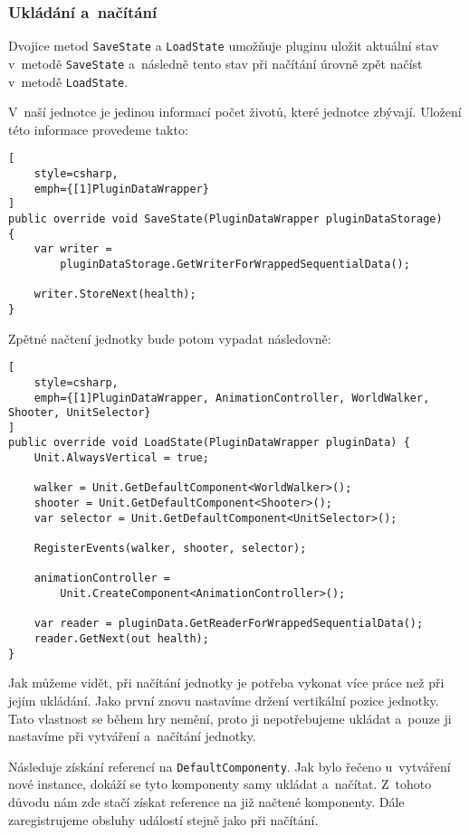 \subsubsection{Ukládání a~načítání}

Dvojice metod \texttt{SaveState} a \texttt{LoadState} umožňuje pluginu uložit aktuální stav v~metodě \texttt{SaveState} a~následně tento stav při načítání úrovně zpět načíst v~metodě \texttt{LoadState}.

V~naší jednotce je jedinou informací počet životů, které jednotce zbývají. Uložení této informace provedeme takto:
\begin{lstlisting}[
	style=csharp,
	emph={[1]PluginDataWrapper}
]
public override void SaveState(PluginDataWrapper pluginDataStorage)
{
	var writer = 
		pluginDataStorage.GetWriterForWrappedSequentialData();

	writer.StoreNext(health);
}
\end{lstlisting}

\newpage
Zpětné načtení jednotky bude potom vypadat následovně:
\begin{lstlisting}[
	style=csharp,
	emph={[1]PluginDataWrapper, AnimationController, WorldWalker, Shooter, UnitSelector}
]
public override void LoadState(PluginDataWrapper pluginData) {
	Unit.AlwaysVertical = true;

	walker = Unit.GetDefaultComponent<WorldWalker>();
	shooter = Unit.GetDefaultComponent<Shooter>();
	var selector = Unit.GetDefaultComponent<UnitSelector>();

	RegisterEvents(walker, shooter, selector);

	animationController =
		Unit.CreateComponent<AnimationController>();

	var reader = pluginData.GetReaderForWrappedSequentialData();
	reader.GetNext(out health);
}
\end{lstlisting}

Jak můžeme vidět, při načítání jednotky je potřeba vykonat více práce než při jejím ukládání. Jako první znovu nastavíme držení vertikální pozice jednotky. Tato vlastnost se během hry nemění, proto ji nepotřebujeme ukládat a~pouze ji nastavíme při vytváření a~načítání jednotky. 

Následuje získání referencí na \texttt{DefaultComponenty}. Jak bylo řečeno u~vytváření nové instance, dokáží se tyto komponenty samy ukládat a~načítat. Z~tohoto důvodu nám zde stačí získat reference na již načtené komponenty. Dále zaregistrujeme obsluhy událostí stejně jako při načítání. 

